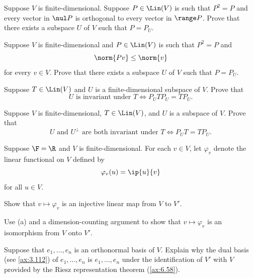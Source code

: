 \begin{exercise}
Suppose $V$ is finite-dimensional. Suppose $P\in\Lin(V)$ is such that $P^2=P$
and every vector in $\nul P$ is orthogonal to every vector in $\range P$. Prove
that there exists a subspace $U$ of $V$ such that $P=P_U$.
\end{exercise}

\begin{exercise}
Suppose $V$ is finite-dimensional and $P\in\Lin(V)$ is such that $P^2=P$ and
\[ \norm{Pv} \le \norm{v} \]
for every $v\in V$. Prove that there exists a subspace $U$ of $V$ such that
$P=P_U$.
\end{exercise}

\begin{exercise}
Suppose $T\in\Lin(V)$ and $U$ is a finite-dimensional subspace of $V$. Prove
that
\[ U \text{ is invariant under } T \iff P_UTP_U=TP_U. \]
\end{exercise}

\begin{exercise}
Suppose $V$ is finite-dimensional, $T\in\Lin(V)$, and $U$ is a subspace of $V$.
Prove that
\[ U \text{ and } U^\perp \text{ are both invariant under } T
   \iff P_UT=TP_U. \]
\end{exercise}

\begin{exercise}
Suppose $\F=\R$ and $V$ is finite-dimensional. For each $v\in V$, let
$\varphi_v$ denote the linear functional on $V$ defined by
\[ \varphi_v(u) = \ip{u}{v} \]
for all $u\in V$.
\begin{parts}
\item Show that $v\mapsto\varphi_v$ is an injective linear map from $V$ to
  $V'$.
\item Use (a) and a dimension-counting argument to show that
  $v\mapsto\varphi_v$ is an isomorphism from $V$ onto $V'$.
\end{parts}
\end{exercise}

\begin{exercise}
Suppose that $e_1,\dots,e_n$ is an orthonormal basis of $V$. Explain why the
dual basis (see \ref{ax:3.112}) of $e_1,\dots,e_n$ is $e_1,\dots,e_n$ under the
identification of $V'$ with $V$ provided by the Riesz representation theorem
(\ref{ax:6.58}).
\end{exercise}

